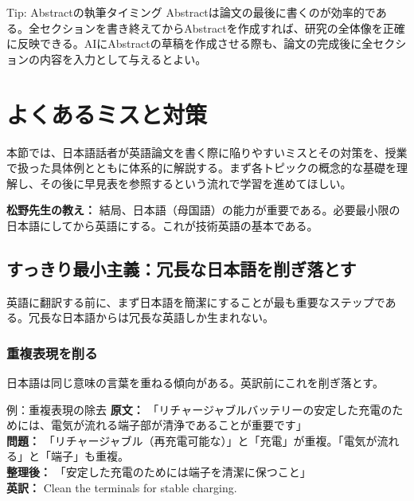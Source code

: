 \begin{itembox}[l]{Tip: Abstractの執筆タイミング}
Abstractは論文の最後に書くのが効率的である。全セクションを書き終えてからAbstractを作成すれば、研究の全体像を正確に反映できる。AIにAbstractの草稿を作成させる際も、論文の完成後に全セクションの内容を入力として与えるとよい。
\end{itembox}

\section{よくあるミスと対策}
\label{sec:4.6}

本節では、日本語話者が英語論文を書く際に陥りやすいミスとその対策を、授業で扱った具体例とともに体系的に解説する。まず各トピックの概念的な基礎を理解し、その後に早見表を参照するという流れで学習を進めてほしい。

\begin{screen}
\textbf{松野先生の教え：} 結局、日本語（母国語）の能力が重要である。必要最小限の日本語にしてから英語にする。これが技術英語の基本である。
\end{screen}

\subsection{すっきり最小主義：冗長な日本語を削ぎ落とす}

英語に翻訳する前に、まず日本語を簡潔にすることが最も重要なステップである。冗長な日本語からは冗長な英語しか生まれない。

\subsubsection{重複表現を削る}

日本語は同じ意味の言葉を重ねる傾向がある。英訳前にこれを削ぎ落とす。

\begin{itembox}[l]{例：重複表現の除去}
\textbf{原文：} 「リチャージャブルバッテリーの安定した充電のためには、電気が流れる端子部が清浄であることが重要です」\\
\textbf{問題：} 「リチャージャブル（再充電可能な）」と「充電」が重複。「電気が流れる」と「端子」も重複。\\
\textbf{整理後：} 「安定した充電のためには端子を清潔に保つこと」\\
\textbf{英訳：} Clean the terminals for stable charging.
\end{itembox}

